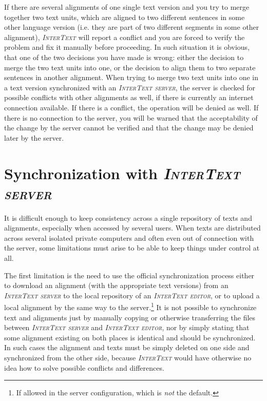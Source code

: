 \documentclass[a4paper,10pt,oneside]{book}
\newcommand{\IT}{\textit{\textsc{InterText}}\xspace}
\newcommand{\ITeditor}{\textit{\textsc{InterText editor}}\xspace}
\newcommand{\ITserver}{\textit{\textsc{InterText server}}\xspace}
\begin{document}
If there are several alignments of one single text version and you try to merge together two text units, which are aligned to two different sentences in some other language version (i.e. they are part of two different segments in some other alignment), \IT will report a conflict and you are forced to verify the problem and fix it manually before proceeding. In such situation it is obvious, that one of the two decisions you have made is wrong: either the decision to merge the two text units into one, or the decision to align them to two separate sentences in another alignment. When trying to merge two text units into one in a text version synchronized with an \ITserver, the server is checked for possible conflicts with other alignments as well, if there is currently an internet connection available. If there is a conflict, the operation will be denied as well. If there is no connection to the server, you will be warned that the acceptability of the change by the server cannot be verified and 
that the change may be denied later by the server.

\section{Synchronization with \ITserver}\label{ch:intro:itbasics:synchronization}

It is difficult enough to keep consistency across a single repository of texts and alignments, especially when accessed by several users. When texts are distributed across several isolated private computers and often even out of connection with the server, some limitations must arise to be able to keep things under control at all.

The first limitation is the need to use the official synchronization process either to download an alignment (with the appropriate text versions) from an \ITserver to the local repository of an \ITeditor, or to upload a local alignment by the same way to the server.\footnote{If allowed in the server configuration, which is \emph{not} the default.} It is not possible to synchronize text and alignments just by manually copying or otherwise transferring the files between \ITserver and \ITeditor, nor by simply stating that some alignment existing on both places is identical and should be synchronized. In such cases the alignment and texts must be simply deleted on one side and synchronized from the other side, because \IT would have otherwise no idea how to solve possible conflicts and differences.
\end{document}
